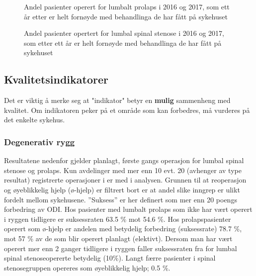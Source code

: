 \documentclass [norsk,a4paper,twoside]{article}\usepackage[]{graphicx}\usepackage[]{color}
\begin{document}
\begin{figure}[h] 
\caption{Andel pasienter operert for lumbalt prolaps i 2016 og 2017, som ett år etter er 
helt fornøyde med behandlinga de har fått på sykehuset}
\label{fig:FornoydAvdPro}
\end{figure}

\begin{figure}[h] 
\caption{Andel pasienter opertert for lumbal spinal stenose i  2016 og 2017, som etter ett år er helt fornøyde med behandlinga de har fått på sykehuset}
\label{fig:FornoydAvdSS}
\end{figure}

\clearpage




      



\subsection{Kvalitetsindikatorer}
Det er viktig å merke seg at "indikator"  betyr en \textbf{mulig} sammenheng 
med kvalitet. Om indikatoren peker på et område som kan forbedres, må vurderes på det enkelte sykehus.

\subsubsection{Degenerativ rygg}





      
      Resultatene nedenfor gjelder planlagt, første gangs operasjon for lumbal spinal stenose og prolaps.
Kun avdelinger med mer enn 10 evt. 20 (avhenger av type resultat) registrerte operasjoner i er med i
analysen.
Grunnen til at reoperasjon og øyeblikkelig hjelp (ø-hjelp)
er filtrert bort er at andel slike inngrep er ulikt fordelt mellom sykehusene. 
      ''Suksess'' er her definert som mer enn 20 poengs forbedring av ODI. 
Hos pasienter med lumbalt prolaps som ikke har vært operert i ryggen tidligere er 
suksessraten 63.5 \% mot 54.6 \%. Hos prolapspasienter operert som ø-hjelp er andelen med betydelig forbedring 
(suksessrate)  78.7 \%, mot 57 \% av de som blir 
operert planlagt (elektivt). Dersom man har vært operert mer enn 2 ganger tidligere i
ryggen faller suksessraten fra  for lumbal spinal stenoseopererte betydelig (10\%). Langt færre pasienter i spinal stenosegruppen opereres som øyeblikkelig hjelp; 0.5 \%.  
\end{document}
